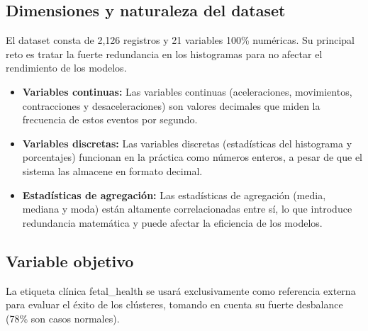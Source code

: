 \documentclass[12pt,letterpaper]{article}
\begin{document}
\subsection{Dimensiones y naturaleza del dataset}

El dataset consta de 2,126 registros y 21 variables 100\% numéricas. Su principal reto es tratar la fuerte redundancia en los histogramas para no afectar el rendimiento de los modelos.

\begin{itemize}[leftmargin=2em, itemsep=4pt]
  \item \textbf{Variables continuas:} Las variables continuas (aceleraciones, movimientos, contracciones y desaceleraciones) son valores decimales que miden la frecuencia de estos eventos por segundo.

  \item \textbf{Variables discretas:} Las variables discretas (estadísticas del histograma y porcentajes) funcionan en la práctica como números enteros, a pesar de que el sistema las almacene en formato decimal.

  \item \textbf{Estadísticas de agregación:} Las estadísticas de agregación (media, mediana y moda) están altamente correlacionadas entre sí, lo que introduce redundancia matemática y puede afectar la eficiencia de los modelos.
\end{itemize}

\subsection{Variable objetivo}

La etiqueta clínica fetal\_health se usará exclusivamente como referencia externa para evaluar el éxito de los clústeres, tomando en cuenta su fuerte desbalance (78\% son casos normales).
\end{document}
